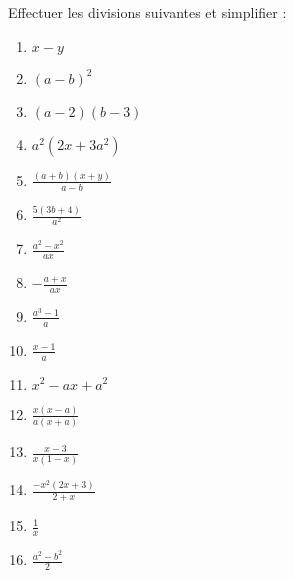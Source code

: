 \begin{solution}
Effectuer les divisions suivantes et simplifier :
\begin{multicols}{2}
\begin{enumerate}
\item $x-y$
\item ${{(a-b)}^{2}}$
\item $(a-2)(b-3)$
\item ${{a}^{2}}(2x+3{{a}^{2}})$
\item $\frac{(a+b)(x+y)}{a-b}$
\item $\frac{5(3b+4)}{{{a}^{2}}}$
\item $\frac{{{a}^{2}}-{{x}^{2}}}{ax}$
\item $-\frac{a+x}{ax}$
\item $\frac{{{a}^{3}}-1}{a}$
\item $\frac{x-1}{a}$
\item ${{x}^{2}}-ax+{{a}^{2}}$
\item $\frac{x(x-a)}{a(x+a)}$
\item $\frac{x-3}{x(1-x)}$
\item $\frac{-{{x}^{2}}(2x+3)}{2+x}$
\item $\frac{1}{x}$
\item $\frac{{{a}^{2}}-{{b}^{2}}}{2}$
\end{enumerate}
\end{multicols}
\end{solution}

